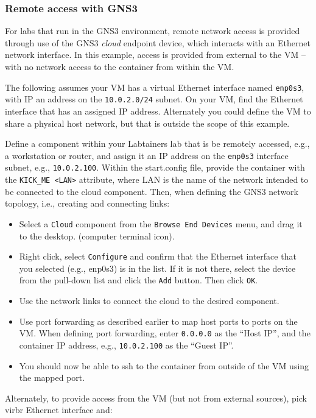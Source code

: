 \documentclass[12pt]{article}
\begin{document}
\subsubsection{Remote access with GNS3}
For labs that run in the GNS3 environment, remote network access is provided through use of the GNS3 \textit{cloud} 
endpoint device, which interacts with an Ethernet network interface.  In this example, access is provided from external to
the VM -- with no network access to the container from within the VM.

The following assumes your VM has a virtual Ethernet interface named {\tt enp0s3}, with IP an address  on the
{\tt 10.0.2.0/24} subnet.  On your VM, find the Ethernet interface that has an assigned IP address. 
Alternately you could define the VM to share a physical host network, but that is outside the scope of this example.

Define a component within your Labtainers lab that is be remotely accessed, e.g., a workstation or router, and assign it an IP
address on the {\tt enp0s3} interface subnet, e.g., {\tt 10.0.2.100}.  Within the start.config file, provide the container with
the {\tt KICK\_ME <LAN>} attribute, where LAN is the name of the network intended to be connected to the cloud component.  Then, 
when defining the GNS3 network topology, i.e., creating and connecting links: 

\begin{itemize}
\item Select a {\tt Cloud} component from the {\tt Browse End Devices} menu, and drag it to the desktop.  
(computer terminal icon).
\item Right click, select {\tt Configure} and confirm that the Ethernet interface that you selected (e.g., enp0s3) is in the list.
If it is not there, select the device from the pull-down list and click the {\tt Add} button.  Then click {\tt OK}.
\item Use the network links to connect the cloud to the desired component.
\item Use port forwarding as described earlier to map host ports to ports on the VM.  When defining port forwarding, enter 
{\tt 0.0.0.0} as the ``Host IP'', and the container IP address, e.g., {\tt 10.0.2.100} as the ``Guest IP''.
\item You should now be able to ssh to the container from outside of the VM using the mapped port.
\end{itemize}


Alternately, to provide access from the VM (but not from external sources), pick virbr Ethernet interface and:
\end{document}

